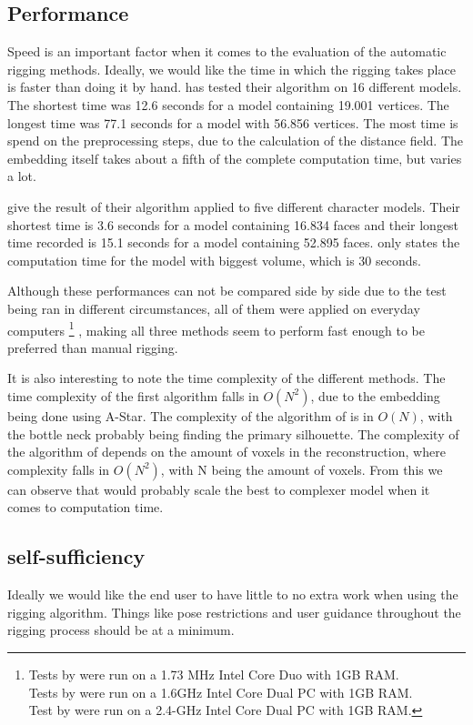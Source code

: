 \documentclass{article}
\begin{document}
\subsection{Performance}
Speed is an important factor when it comes to the evaluation of the automatic rigging
methods. Ideally, we would like the time in which the rigging takes place is
faster than doing it by hand. \citep{paper1} has tested their algorithm on 16
different models. The shortest time was 12.6 seconds for a model containing 19.001
vertices. The longest time was 77.1 seconds for a model with 56.856 vertices.
The most time is spend on the preprocessing steps, due to the calculation of the
distance field. The embedding itself takes about a fifth of the complete
computation time, but varies a lot.

\citep{paper2} give the result of their algorithm applied to five different
character models. Their shortest time is 3.6 seconds for a model containing
16.834 faces and their longest time recorded is 15.1 seconds for a model
containing 52.895 faces.
\citep{paper3} only states the computation time for the model with biggest
volume, which is 30 seconds.

Although these performances can not be compared side by side due to the test
being ran in different circumstances, all of them were applied on everyday
computers \footnote{Tests by \citep{paper1} were run on a 1.73 MHz Intel Core Duo
    with 1GB RAM.\\ Tests by \citep{paper2} were run on a 1.6GHz Intel Core Dual PC
    with 1GB RAM.\\
Test by \citep{paper3} were run on a 2.4-GHz Intel Core Dual PC with 1GB RAM.}
, making all three methods seem to perform fast enough to be preferred than
manual rigging. 

It is also interesting to note the time complexity of the different methods.
The time complexity of the first algorithm falls in $O(N^2)$, due to the
embedding being done using A-Star.
The complexity of the algorithm of \citep{paper2} is in $O(N)$, with the bottle
neck probably being finding the primary silhouette.
The complexity of the algorithm of \citep{paper3} depends on the amount of
voxels in the reconstruction, where complexity falls in $O(N^2)$, with N being the
amount of voxels.
From this we can observe that \citep{paper2} would probably scale the best to
complexer model when it comes to computation time.

\subsection{self-sufficiency}
Ideally we would like the end user to have little
to no extra work when using the rigging algorithm. Things like pose restrictions
and user guidance throughout the rigging process should be at a minimum.
\end{document}
